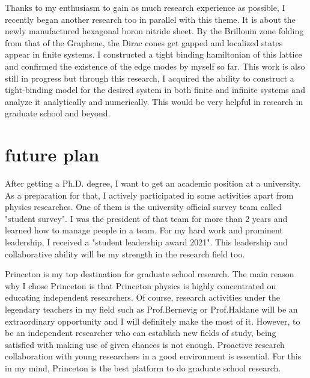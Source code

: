 \documentclass[a4]{article}
\begin{document}
Thanks to my enthusiasm to gain as much research experience as possible, I recently began another research too in parallel with this theme. It is about the newly manufactured hexagonal boron nitride sheet. By the Brillouin zone folding from that of the Graphene, the Dirac cones get gapped and localized states appear in finite systems. I constructed a tight binding hamiltonian of this lattice and confirmed the existence of the edge modes by myself so far. This work is also still in progress but through this research, I acquired the ability to construct a tight-binding model for the desired system in both finite and infinite systems and analyze it analytically and numerically. This would be very helpful in research in graduate school and beyond.\par


\section{future plan}
After getting a Ph.D. degree, I want to get an academic position at a university. As a preparation for that, I actively participated in some activities apart from physics researches. One of them is the university official survey team called "student survey". I was the president of that team for more than 2 years and learned how to manage people in a team. For my hard work and prominent leadership, I received a "student leadership award 2021". This leadership and collaborative ability will be my strength in the research field too.\par

Princeton is my top destination for graduate school research. The main reason why I chose Princeton is that Princeton physics is highly concentrated on educating independent researchers. Of course, research activities under the legendary teachers in my field such as Prof.Bernevig or Prof.Haldane will be an extraordinary opportunity and I will definitely make the most of it. However, to be an independent researcher who can establish new fields of study, being satisfied with making use of given chances is not enough. Proactive research collaboration with young researchers in a good environment is essential. For this in my mind, Princeton is the best platform to do graduate school research.
\end{document}
